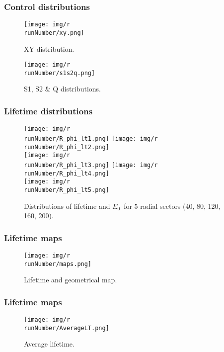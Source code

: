 \begin{frame}
\frametitle{Control distributions}
\begin{figure}
  \begin{center}
      \texttt{[image: img/r\\runNumber/xy.png]}
    \caption{XY distribution.}
  \end{center}
\end{figure}
\end{frame}

\begin{frame}
\begin{figure}
  \begin{center}
      \texttt{[image: img/r\\runNumber/s1s2q.png]}
    \caption{S1, S2 \& Q distributions.}
  \end{center}
\end{figure}
\end{frame}

\begin{frame}
\frametitle{Lifetime distributions}
\begin{figure}
  \begin{center}
      \texttt{[image: img/r\\runNumber/R\_phi\_lt1.png]}
      \texttt{[image: img/r\\runNumber/R\_phi\_lt2.png]} \\
      \texttt{[image: img/r\\runNumber/R\_phi\_lt3.png]}
      \texttt{[image: img/r\\runNumber/R\_phi\_lt4.png]}\\
      \texttt{[image: img/r\\runNumber/R\_phi\_lt5.png]}
    \caption{Distributions of lifetime and $E_0$~for 5 radial sectors (40, 80, 120, 160, 200).}
  \end{center}
\end{figure}
\end{frame}

\begin{frame}
\frametitle{Lifetime maps}
\begin{figure}
  \begin{center}
      \texttt{[image: img/r\\runNumber/maps.png]}
    \caption{Lifetime and geometrical map.}
  \end{center}
\end{figure}
\end{frame}

\begin{frame}
\frametitle{Lifetime maps}
\begin{figure}
  \begin{center}
      \texttt{[image: img/r\\runNumber/AverageLT.png]}
    \caption{Average lifetime.}
  \end{center}
\end{figure}
\end{frame}

